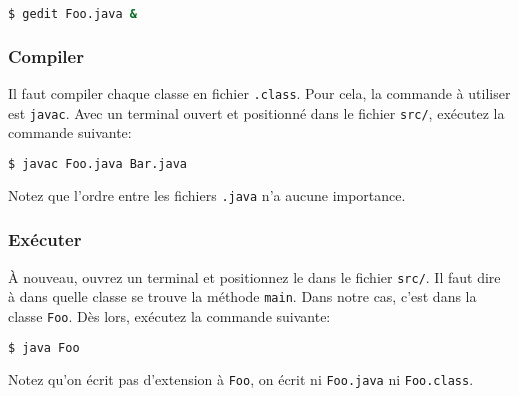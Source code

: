 \begin{lstlisting}[language={sh}, morekeywords={gedit}]
$ gedit Foo.java &
\end{lstlisting}

\subsubsection{Compiler}
Il faut compiler chaque classe en fichier \lstinline|.class|.
Pour cela, la commande à utiliser est \lstinline|javac|.
Avec un terminal ouvert et positionné dans le fichier \lstinline|src/|,
exécutez la commande suivante:
\begin{lstlisting}[language={sh}, morekeywords={javac}]
$ javac Foo.java Bar.java
\end{lstlisting}
Notez que l'ordre entre les fichiers \lstinline|.java| n'a aucune importance.

\subsubsection{Exécuter}
À nouveau,
ouvrez un terminal et positionnez le dans le fichier \lstinline|src/|.
Il faut dire à \java{} dans quelle classe se trouve la méthode \lstinline|main|.
Dans notre cas, c'est dans la classe \lstinline|Foo|.
Dès lors, exécutez la commande suivante:
\begin{lstlisting}[language={sh}, morekeywords={java}]
$ java Foo
\end{lstlisting}
Notez qu'on écrit pas d'extension à \lstinline|Foo|,
on écrit ni \lstinline|Foo.java| ni \lstinline|Foo.class|.


